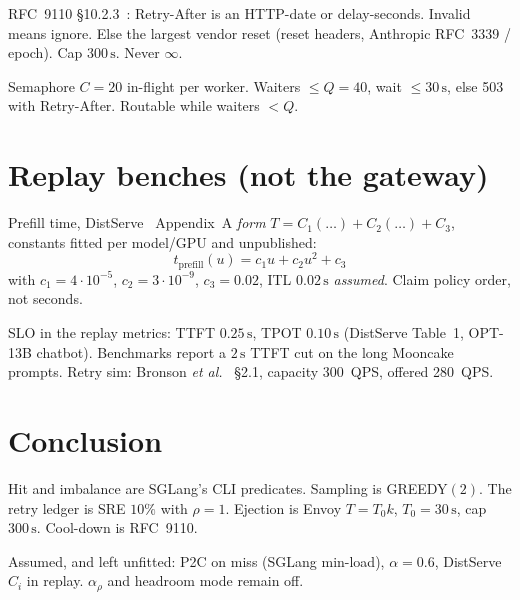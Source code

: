 \documentclass[journal,onecolumn]{IEEEtran}
\begin{document}
RFC~9110 §10.2.3~\cite{rfc9110}: Retry-After is an HTTP-date or
delay-seconds. Invalid means ignore. Else the largest vendor
reset (reset headers, Anthropic RFC~3339 / epoch). Cap
$300\,\mathrm{s}$. Never $\infty$.

Semaphore $C=20$ in-flight per worker. Waiters $\le Q=40$, wait
$\le 30\,\mathrm{s}$, else 503 with Retry-After. Routable while
waiters $<Q$.

\section{Replay benches (not the gateway)}
\label{sec:replay}

Prefill time, DistServe~\cite{zhong2024} Appendix~A \emph{form}
$T=C_1(\ldots)+C_2(\ldots)+C_3$, constants fitted per model/GPU and
unpublished:
\[
t_{\mathrm{prefill}}(u)=c_1 u+c_2 u^2+c_3
\]
with $c_1=4\cdot10^{-5}$, $c_2=3\cdot10^{-9}$, $c_3=0.02$, ITL
$0.02\,\mathrm{s}$ \emph{assumed}. Claim policy order, not seconds.

SLO in the replay metrics: TTFT $0.25\,\mathrm{s}$, TPOT
$0.10\,\mathrm{s}$ (DistServe Table~1, OPT-13B chatbot). Benchmarks
report a $2\,\mathrm{s}$ TTFT cut on the long Mooncake prompts. Retry
sim: Bronson \emph{et al.}~\cite{bronson2021} §2.1, capacity 300~QPS,
offered 280~QPS.

\section{Conclusion}

Hit and imbalance are SGLang's CLI predicates. Sampling is GREEDY$(2)$.
The retry ledger is SRE $10\%$ with $\rho=1$. Ejection is Envoy
$T=T_0 k$, $T_0=30\,\mathrm{s}$, cap $300\,\mathrm{s}$. Cool-down is
RFC~9110.

Assumed, and left unfitted: P2C on miss (SGLang min-load),
$\alpha=0.6$, DistServe $C_i$ in replay. $\alpha_{\rho}$ and headroom
mode remain off.
\end{document}
